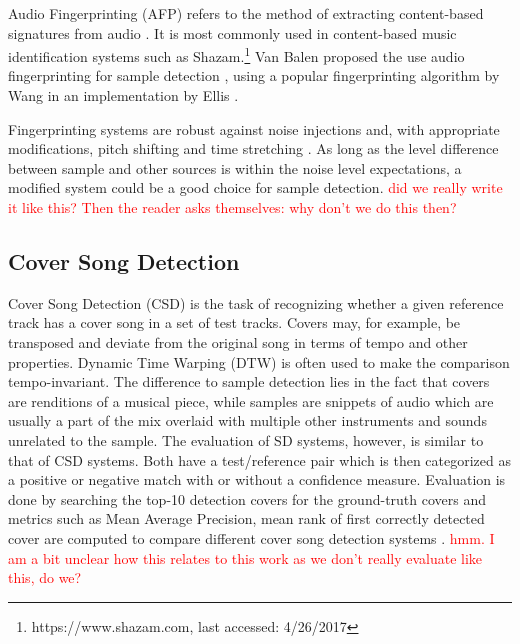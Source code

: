\documentclass{article}
\begin{document}
Audio Fingerprinting (AFP) refers to the method of extracting content-based signatures from audio \cite{cano2005review,haitsma2002highly,baluja2007audio}. It is most commonly used in content-based music identification systems such as Shazam.\footnote{https://www.shazam.com, last accessed: 4/26/2017}
Van Balen proposed the use audio fingerprinting for sample detection \cite{van2011automatic,van2012automatic}, using a popular fingerprinting algorithm by Wang \cite{wang2003industrial} in an implementation by Ellis \cite{ellisfinger}. 


Fingerprinting systems are robust against noise injections and, with appropriate modifications, pitch shifting and time stretching \cite{zhu2010novel}. As long as the level difference between sample and other sources is within the noise level expectations, a modified system could be a good choice for sample detection. {\textcolor{red}{did we really write it like this? Then the reader asks themselves: why don't we do this then?}}

\subsection{Cover Song Detection}
Cover Song Detection (CSD) is the task of recognizing whether a given reference track has a cover song in a set of test tracks\cite{Ellis2007Cover,ravuri2010cover,bertin2011large}.
Covers may, for example, be transposed and deviate from the original song in terms of tempo and other properties. Dynamic Time Warping (DTW) \cite{sakoe1978dynamic} is often used to make the comparison tempo-invariant. The difference to sample detection lies in the fact that covers are renditions of a musical piece, while samples are snippets of audio which are usually a part of the mix overlaid with multiple other instruments and sounds unrelated to the sample.
%
The evaluation of SD systems, however, is similar to that of CSD systems. Both have a test/reference pair which is then categorized as a positive or negative match with or without a confidence measure. Evaluation is done by searching the top-10 detection covers for the ground-truth covers and metrics such as Mean Average Precision, mean rank of first correctly detected cover are computed to compare different cover song detection systems \cite{serracover,serra2007cover}.  {\textcolor{red}{hmm. I am a bit unclear how this relates to this work as we don't really evaluate like this, do we?}}
\end{document}
